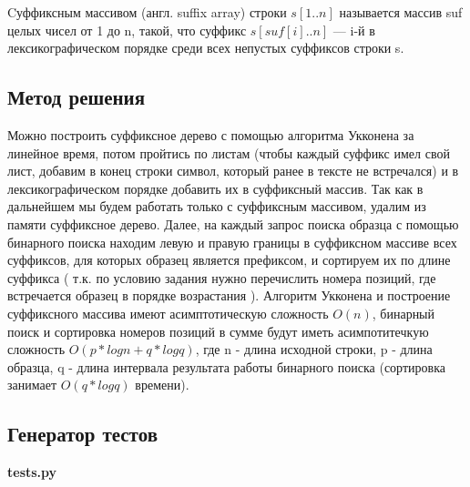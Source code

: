 \documentclass[12pt]{article}
\newcommand{\print}[1]{{\large  \bf  #1} 
{\scriptsize }}
\begin{document}
Cуффиксным массивом (англ. suffix array) строки $s[1..n]$ называется массив suf целых чисел от 1 до n, такой, что суффикс $s[suf[i]..n]$ — i-й в лексикографическом порядке среди всех непустых суффиксов строки s.

\subsection*{Метод решения}

Можно построить суффиксное дерево с помощью алгоритма Укконена за линейное время, потом пройтись по листам (чтобы каждый суффикс имел свой лист, добавим в конец строки символ, который ранее в тексте не встречался) и в лексикографическом порядке добавить их в суффиксный массив. Так как в дальнейшем мы будем работать только с суффиксным массивом, удалим из памяти суффиксное дерево. Далее, на каждый запрос поиска образца с помощью бинарного поиска находим левую и правую границы в суффиксном массиве всех суффиксов, для которых образец является префиксом, и сортируем их по длине суффикса ( т.к. по условию задания нужно перечислить номера позиций, где встречается образец в порядке возрастания ). Алгоритм Укконена и построение суффиксного массива имеют асимптотическую сложность $O(n)$, бинарный поиск и сортировка номеров позиций в сумме будут иметь асимпотитечкую сложность $O(p*log n + q * log q)$, где n - длина исходной строки, p - длина образца, q - длина интервала результата работы бинарного поиска (сортировка занимает $O(q*log q)$ времени).

\subsection*{Генератор тестов}
\print{tests.py}
\end{document}
